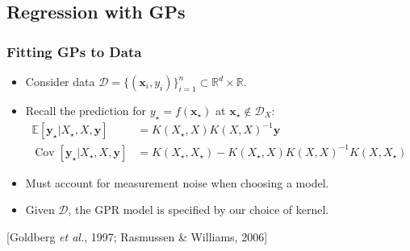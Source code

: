 \documentclass{beamer}
\newcommand{\R}{\mathbb{R}}
\newcommand{\vect}[1]{\boldsymbol{#1}}
\newcommand{\E}[1]{\mathbb{E}\left[#1\right]}
\DeclareMathOperator{\Cov}{Cov}
\newcommand{\citeAY}[1]{
	\begin{flushright}
		{\footnotesize [#1]}
	\end{flushright}
}
\begin{document}
	\subsection{Regression with GPs}
	\begin{frame}
		\frametitle{Fitting GPs to Data}
		\begin{itemize}
			\item Consider data $\mathcal{D}=\{(\vect{x}_i,y_i)\}_{i=1}^n\subset\R^d\times\R$.
			\item Recall the prediction for $y_\star=f(\vect{x}_\star)$ at $\vect{x}_\star\notin\mathcal{D}_X$:
			\begin{align*}
				\E{\vect{y}_\star|X_\star,X,\vect{y}} & =K(X_\star,X)K(X,X)^{-1}\vect{y}\\
				\Cov\left[\vect{y}_\star|X_\star,X,\vect{y}\right] & =K(X_\star,X_\star)-K(X_\star,X)K(X,X)^{-1}K(X,X_\star)
			\end{align*}
			\item Must account for measurement noise when choosing a model.
			\item Given $\mathcal{D}$, the GPR model is specified by our choice of kernel.
		\end{itemize}
		\citeAY{Goldberg \emph{et al.}, 1997; Rasmussen \& Williams, 2006}
	\end{frame}
	
	
\end{document}
